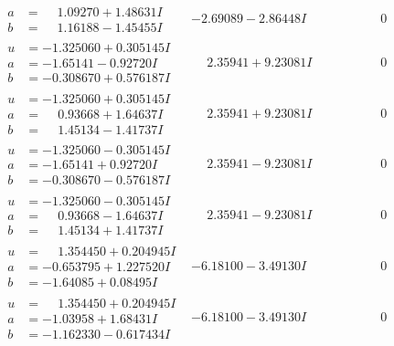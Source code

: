 \documentclass[1p]{elsarticle_modified}
\theoremstyle{definition}
\begin{document}
$$\begin{array}{c|c|c}
\begin{aligned}
a &= \phantom{-}1.09270 + 1.48631 I \\
b &= \phantom{-}1.16188 - 1.45455 I\end{aligned}
 & -2.69089 - 2.86448 I & \phantom{-0.000000 } 0 \\ \hline\begin{aligned}
u &= -1.325060 + 0.305145 I \\
a &= -1.65141 - 0.92720 I \\
b &= -0.308670 + 0.576187 I\end{aligned}
 & \phantom{-}2.35941 + 9.23081 I & \phantom{-0.000000 } 0 \\ \hline\begin{aligned}
u &= -1.325060 + 0.305145 I \\
a &= \phantom{-}0.93668 + 1.64637 I \\
b &= \phantom{-}1.45134 - 1.41737 I\end{aligned}
 & \phantom{-}2.35941 + 9.23081 I & \phantom{-0.000000 } 0 \\ \hline\begin{aligned}
u &= -1.325060 - 0.305145 I \\
a &= -1.65141 + 0.92720 I \\
b &= -0.308670 - 0.576187 I\end{aligned}
 & \phantom{-}2.35941 - 9.23081 I & \phantom{-0.000000 } 0 \\ \hline\begin{aligned}
u &= -1.325060 - 0.305145 I \\
a &= \phantom{-}0.93668 - 1.64637 I \\
b &= \phantom{-}1.45134 + 1.41737 I\end{aligned}
 & \phantom{-}2.35941 - 9.23081 I & \phantom{-0.000000 } 0 \\ \hline\begin{aligned}
u &= \phantom{-}1.354450 + 0.204945 I \\
a &= -0.653795 + 1.227520 I \\
b &= -1.64085 + 0.08495 I\end{aligned}
 & -6.18100 - 3.49130 I & \phantom{-0.000000 } 0 \\ \hline\begin{aligned}
u &= \phantom{-}1.354450 + 0.204945 I \\
a &= -1.03958 + 1.68431 I \\
b &= -1.162330 - 0.617434 I\end{aligned}
 & -6.18100 - 3.49130 I & \phantom{-0.000000 } 0\\

\end{array}$$
\end{document}
